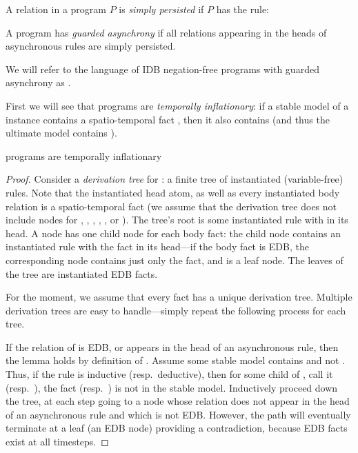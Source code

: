 \begin{definition}
A relation  in a \lang program $P$ is {\em simply persisted} if $P$ has the rule: 
\end{definition}

\begin{definition}
A \lang program has {\em guarded asynchrony} if all relations appearing in the heads of asynchronous rules are simply persisted.
\end{definition}

We will refer to the language of IDB negation-free \lang programs with guarded
asynchrony as \slang.

First we will see that \slang programs are {\em temporally inflationary}: if a stable model
of a \slang instance contains a spatio-temporal fact , then it also
contains  (and thus the ultimate model contains ).

\begin{lemma}
\label{lem:inflationary}
\slang programs are temporally inflationary
\end{lemma}
\begin{proof}
Consider a {\em derivation tree} for : a finite tree of instantiated (variable-free) rules.  Note that the instantiated head atom, as well as every instantiated body relation is a spatio-temporal fact (we assume that the derivation tree does not include nodes for , , , , \dedalus{<}, or ).  The tree's root is some instantiated rule with  in its head.  A node has one child node for each body fact: the child node contains an instantiated rule with the fact in its head---if the body fact is EDB, the corresponding node contains just only the fact, and is a leaf node.  The leaves of the tree are instantiated EDB facts.

For the moment, we assume that every fact has a unique derivation tree.  Multiple derivation trees are easy to handle---simply repeat the following process for each tree.

If the relation of  is EDB, or appears in the head of an asynchronous rule, then the lemma holds by definition of \slang.  Assume some stable model contains  and not .  Thus, if the rule is inductive (resp.\ deductive), then for some child of , call it  (resp.\ ), the fact  (resp.\ ) is not in the stable model.  Inductively proceed down the tree, at each step going to a node whose relation does not appear in the head of an asynchronous rule and which is not EDB.  However, the path will eventually terminate at a leaf (an EDB node) providing a contradiction, because EDB facts exist at all timesteps.
\end{proof}


